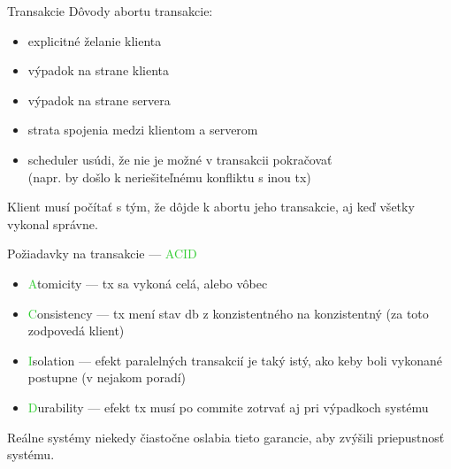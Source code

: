 \documentclass[12pt]{beamer}
\def\green#1{\textcolor{LimeGreen}{#1}}
\begin{document}
\begin{frame}[fragile]{Transakcie}
Dôvody abortu transakcie:
\begin{itemize}
\item explicitné želanie klienta
\item výpadok na strane klienta
\item výpadok na strane servera
\item strata spojenia medzi klientom a serverom
\item scheduler usúdi, že nie je možné v transakcii pokračovať\\
    (napr. by došlo k neriešiteľnému konfliktu s inou tx)
\end{itemize}
Klient musí počítať s tým, že dôjde k abortu jeho transakcie, aj keď všetky vykonal správne.
\end{frame}


\begin{frame}[fragile]{Požiadavky na transakcie --- \green{ACID}}
\begin{itemize}
\item \green{A}tomicity --- tx sa vykoná celá, alebo vôbec
\item \green{C}onsistency --- tx mení stav db z konzistentného na konzistentný (za toto zodpovedá klient)
\item \green{I}solation --- efekt paralelných transakcií je taký istý, ako keby boli vykonané postupne (v nejakom poradí)
\item \green{D}urability --- efekt tx musí po commite zotrvať aj pri výpadkoch systému
\end{itemize}
Reálne systémy niekedy čiastočne oslabia tieto garancie, aby zvýšili priepustnosť systému.
\end{frame}
\end{document}
